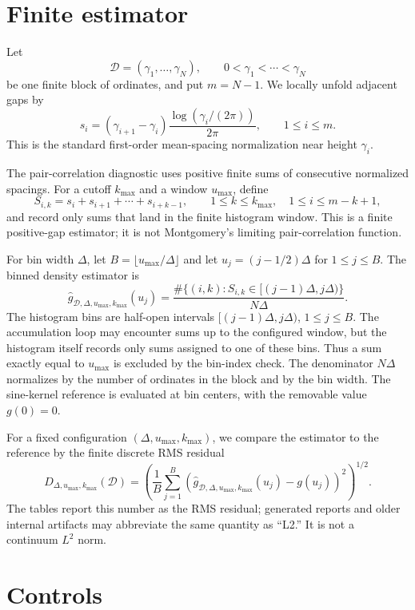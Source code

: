 \documentclass[11pt]{article}
\begin{document}
\section{Finite estimator}

Let
\[
  \mathcal D=(\gamma_1,\ldots,\gamma_N),\qquad
  0<\gamma_1<\cdots<\gamma_N
\]
be one finite block of ordinates, and put $m=N-1$.  We locally unfold adjacent gaps by
\[
  s_i=(\gamma_{i+1}-\gamma_i)\frac{\log(\gamma_i/(2\pi))}{2\pi},
  \qquad 1\leq i\leq m.
\]
This is the standard first-order mean-spacing normalization near height $\gamma_i$.

The pair-correlation diagnostic uses positive finite sums of consecutive normalized spacings.  For a cutoff $k_{\max}$ and a window $u_{\max}$, define
\[
  S_{i,k}=s_i+s_{i+1}+\cdots+s_{i+k-1},
  \qquad 1\leq k\leq k_{\max},\quad 1\leq i\leq m-k+1,
\]
and record only sums that land in the finite histogram window.  This is a finite positive-gap estimator; it is not Montgomery's limiting pair-correlation function.

For bin width $\Delta$, let $B=\lfloor u_{\max}/\Delta\rfloor$ and let $u_j=(j-1/2)\Delta$ for $1\leq j\leq B$.  The binned density estimator is
\[
  \widehat g_{\mathcal D,\Delta,u_{\max},k_{\max}}(u_j)
  =
  \frac{\#\{(i,k):S_{i,k}\in [(j-1)\Delta,j\Delta)\}}{N\Delta}.
\]
The histogram bins are half-open intervals $[(j-1)\Delta,j\Delta)$, $1\leq j\leq B$.  The accumulation loop may encounter sums up to the configured window, but the histogram itself records only sums assigned to one of these bins.  Thus a sum exactly equal to $u_{\max}$ is excluded by the bin-index check.  The denominator $N\Delta$ normalizes by the number of ordinates in the block and by the bin width.  The sine-kernel reference is evaluated at bin centers, with the removable value $g(0)=0$.

For a fixed configuration $(\Delta,u_{\max},k_{\max})$, we compare the estimator to the reference by the finite discrete RMS residual
\[
  D_{\Delta,u_{\max},k_{\max}}(\mathcal D)=
  \left(
    \frac{1}{B}\sum_{j=1}^B
    \left(\widehat g_{\mathcal D,\Delta,u_{\max},k_{\max}}(u_j)-g(u_j)\right)^2
  \right)^{1/2}.
\]
The tables report this number as the RMS residual; generated reports and older internal artifacts may abbreviate the same quantity as ``L2.''  It is not a continuum $L^2$ norm.

\section{Controls}
\end{document}
